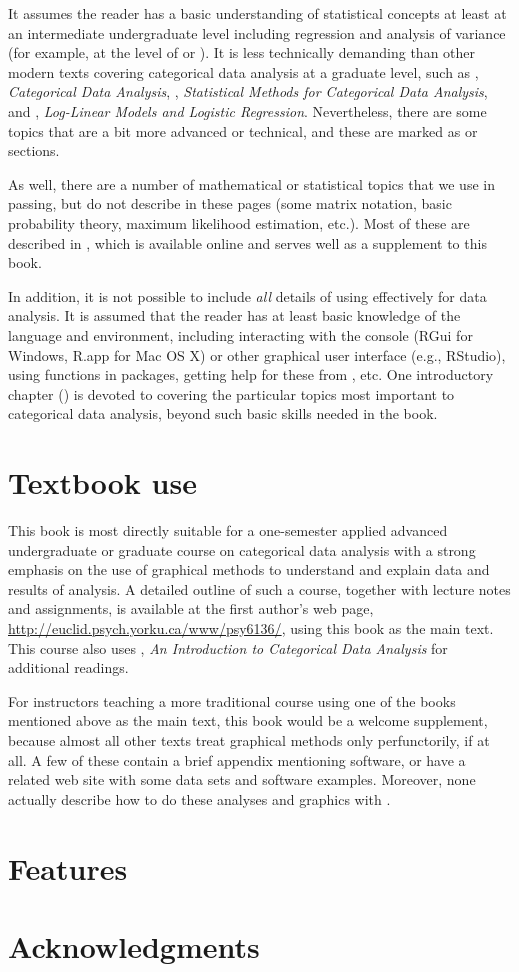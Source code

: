 It assumes the reader has a basic understanding of statistical concepts at least at an
intermediate undergraduate level including regression and analysis of variance
(for example, at the level of \citet{Neter-etal:90} or \citet{MendenhallSincich:2003}).
It is less technically demanding than other modern texts covering
categorical data analysis at a graduate level, such as
 \citet{Agresti:2013}, \emph{Categorical Data Analysis},
 \citet{PowersXie:2008}, \emph{Statistical Methods for Categorical Data Analysis}, and
 \citet{Christensen:97}, \emph{Log-Linear Models and Logistic Regression}.
Nevertheless, there are some topics that are a bit more advanced or technical, and
these are marked as \hard or \veryhard sections.

As well, there are a number of mathematical or 
statistical topics that we use in passing, but do not describe
in these pages (some matrix notation, basic probability theory, maximum likelihood estimation, etc.).
Most of these are described in \citet{Fox:2015}, which is available online and serves well as
a supplement to this book.


In addition, it is not possible to include \emph{all} details of using \R effectively for
data analysis. It is assumed that the reader has at least basic knowledge of the \R language and
environment, including interacting with the \R console (RGui for Windows, R.app for Mac OS X)
or other graphical user interface (e.g., RStudio), using \R functions in packages,
getting help for these from \R, etc.  One introductory chapter () is devoted
to covering the particular topics most important to categorical data analysis,
beyond such basic skills needed in the book.

\section*{Textbook use}
This book is most directly suitable for a one-semester applied 
advanced undergraduate or graduate
course on categorical data analysis with a strong emphasis
on the use of graphical methods to understand and explain data and
results of analysis.
A detailed outline of such a course, together with lecture notes
and assignments,
is available at the first author's
web page, \url{http://euclid.psych.yorku.ca/www/psy6136/}, using this
book as the main text.  This course also uses 
\citet{Agresti:2007:ICDA}, \emph{An Introduction to Categorical Data Analysis}
for additional readings.

For instructors teaching a more traditional course using one of the books
mentioned above as the main text, this book would be a welcome supplement,
because almost all other texts treat graphical methods only perfunctorily,
if at all.
A few of these contain a brief appendix mentioning software, or have
a related web site with some data sets and software examples.
Moreover, none actually describe how to do these analyses and graphics with \R.

\section*{Features}


\section*{Acknowledgments}


